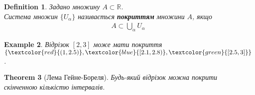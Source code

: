 \documentclass[a4paper, 14pt]{article}
\theoremstyle{theoremdd}
\newtheorem{theorem}{Theorem}[subsection]
\theoremstyle{theoremdd}
\newtheorem{definition}[theorem]{Definition}
\theoremstyle{theoremdd}
\theoremstyle{theoremdd}
\newtheorem{example}[theorem]{Example}
\theoremstyle{theoremdd}
\theoremstyle{theoremdd}
\theoremstyle{theoremdd}
\theoremstyle{theoremdd}
\begin{document}
	\begin{definition}
	Задано множину $A \subset \mathbb{R}$.\\
	Система множин $\{U_{\alpha}\}$ називається \textbf{покриттям} множини $A$, якщо
	\begin{align*}
	A \subset \bigcup_{\alpha} U_{\alpha}
	\end{align*}
	\end{definition}
	
	\begin{example}
	Відрізок $[2,3]$ може мати покриття $\{\textcolor{red}{(1,2.5)}, \textcolor{blue}{[2.1,2.8)}, \textcolor{green}{[2.5,3]}\}$.
	\begin{figure}[H]
	\centering
	\end{figure}
	\end{example}
	
	\begin{theorem}[Лема Гейне-Бореля]
	Будь-який відрізок можна покрити скінченною кількістю інтервалів.
	\end{theorem}
	
\end{document}
